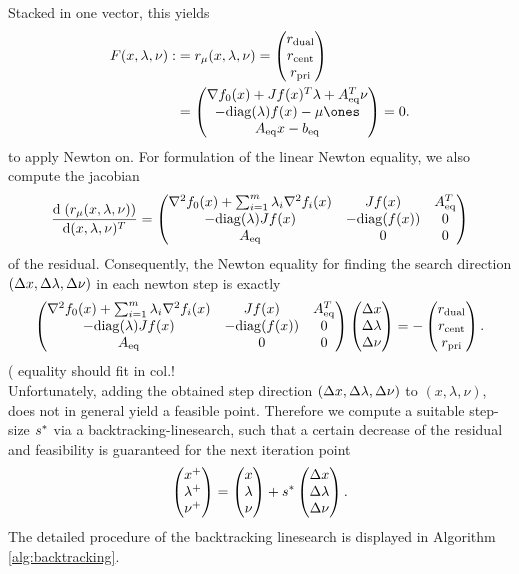 Stacked in one vector, this yields
\begin{align}
\begin{split}
\label{eq:KKTres}
	 F(x,\lambda,\nu) :&= \rmu = \vectorthree{\rdual}{\rcent}{\rpri}\\ &= \vectorthree{\grad \fnull(x) + \jac \fx \trp \lambda + \Aeq \trp \nu}{-\diag(\lambda)\fx - \mu \ones}{\Aeq x - \beq} = 0.
\end{split}
\end{align}
to apply Newton on. For formulation of the linear Newton equality, we also compute  the jacobian
\begin{align}
	\frac{\mathrm{d} \; ( r_\mu (x,\lambda,\nu))}{\mathrm{d} (x,\lambda,\nu)^T} = 
	\begin{pmatrix}
		\nabla^2 f_0(x) + \sum_{i = 1}^{m} \lambda_i \nabla^2 f_i (x) & J f(x) & {A}_{\mathrm{eq}} ^T\\
		-\mathrm{diag}(\lambda) J f(x) & -\mathrm{diag}(f(x)) & 0\\
		{A}_{\mathrm{eq}} & 0 & 0
	\end{pmatrix}
\end{align}
of the residual. 
Consequently, the Newton equality for finding the search direction $ (\Delta x, \Delta \lambda,\Delta \nu) $ in each newton step is exactly
\begin{align}
\label{eq:rmuNewtonEq}
		\begin{pmatrix}
	\nabla^2 f_0(x) + \sum_{i = 1}^{m} \lambda_i \nabla^2 f_i (x) & J f(x) & {A}_{\mathrm{eq}} ^T\\
	-\mathrm{diag}(\lambda) J f(x) & -\mathrm{diag}(f(x)) & 0\\
	{A}_{\mathrm{eq}} & 0 & 0
	\end{pmatrix} \begin{pmatrix} {\Delta x} \\ {\Delta \lambda} \\ {\Delta \nu} \end{pmatrix} = - \begin{pmatrix} {{r}_{\mathrm{dual}}} \\ {{r}_{\mathrm{cent}}} \\ {{r}_{\mathrm{pri}}} \end{pmatrix}.
\end{align}(
\todo equality should fit in col.!\\

Unfortunately, adding the obtained step direction $ (\Delta x, \Delta \lambda,\Delta \nu) $ to $ (x,\lambda,\nu) $, does not in general yield a feasible point. Therefore we compute a suitable step-size $ s^* $ via a backtracking-linesearch, such that a certain decrease of the residual and feasibility is guaranteed for the next iteration point \[ \begin{pmatrix} {x^+} \\ {\lambda^+} \\ {\nu^+} \end{pmatrix} = \begin{pmatrix} {x} \\ {\lambda} \\ {\nu } \end{pmatrix} + s^*  \begin{pmatrix} {\Delta x} \\ {\Delta  \lambda} \\ {\Delta \nu} \end{pmatrix}.\]
The detailed procedure of the backtracking linesearch is displayed in Algorithm \ref{alg:backtracking}.

